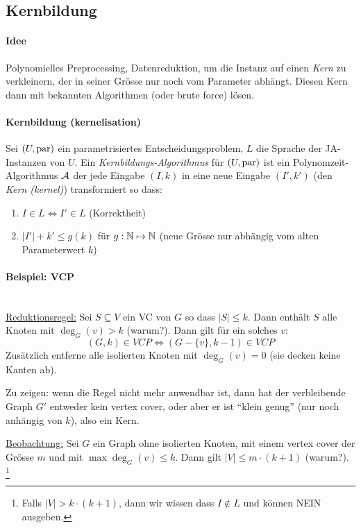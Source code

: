 \subsection{Kernbildung}

\paragraph{Idee}
Polynomielles Preprocessing, Datenreduktion, um die Instanz auf einen \emph{Kern} zu verkleinern,
der in seiner Grösse nur noch vom Parameter abhängt.
Diesen Kern dann mit bekannten Algorithmen (oder brute force) lösen.

\paragraph{Kernbildung (kernelisation)}
Sei $(U, \text{par})$ ein parametrisiertes Entscheidungsproblem, $L$ die Sprache der JA-Instanzen von $U$.
Ein \emph{Kernbildungs-Algorithmus} für $(U, \text{par})$ ist ein Polynomzeit-Algorithmus $\mathcal{A}$ der jede Eingabe $(I, k)$
in eine neue Eingabe $(I', k')$ (den \emph{Kern (kernel)}) transformiert so dass:
\begin{enumerate}[label=(\roman*)]
    \item $ I \in L \iff I' \in L $ (Korrektheit)
    \item $ |I'| + k' \leq g(k) $ für $g : \mathbb{N} \mapsto \mathbb{N}$ (neue Grösse nur abhängig vom alten Parameterwert $k$)
\end{enumerate}

\paragraph{Beispiel: VCP} \mbox{} \\
\underline{Reduktionsregel:}
Sei $S \subseteq V$ ein VC von $G$ so dass $|S| \leq k$. Dann enthält $S$ alle Knoten mit $\deg_G(v) > k$ (warum?).
Dann gilt für ein solches $v$:
$$ (G, k) \in VCP \iff (G-\{v\}, k-1) \in VCP $$
Zusätzlich entferne alle isolierten Knoten mit $\deg_G(v) = 0$ (sie decken keine Kanten ab).

Zu zeigen: wenn die Regel nicht mehr anwendbar ist, dann hat der verbleibende Graph $G'$ entweder kein vertex cover,
oder aber er ist ``klein genug'' (nur noch anhängig von $k$), also ein Kern.

\underline{Beobachtung:}
Sei $G$ ein Graph ohne isolierten Knoten, mit einem vertex cover der Grösse $m$ und mit $\max \deg_G(v) \leq k$.
Dann gilt $|V| \leq m \cdot (k+1)$ (warum?).%
\footnote{Falls $|V| > k \cdot (k+1)$, dann wir wissen dass $ I \notin L$ und können NEIN ausgeben.}


